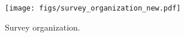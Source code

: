 \begin{figure}[t]
    \centering
    \texttt{[image: figs/survey\_organization\_new.pdf]}
    \caption{
    Survey organization.
    }
    \label{fig: survey_organization}
\end{figure}